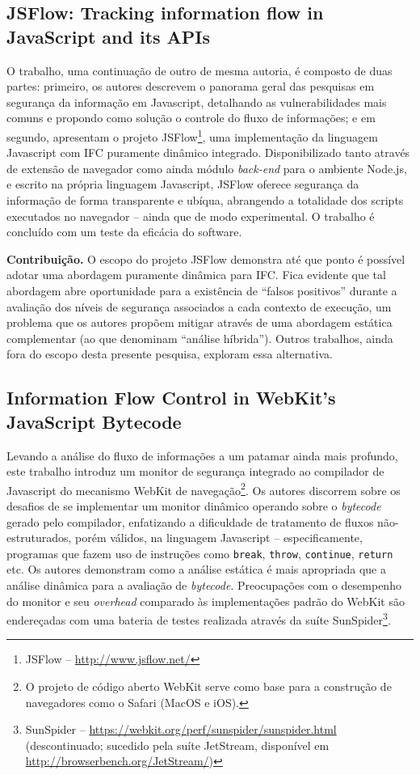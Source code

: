 \subsection{JSFlow: Tracking information flow in JavaScript and its APIs \cite{Hedin2014}}
O trabalho, uma continuação de outro de mesma autoria\cite{Hedin2012}, é composto de duas partes: primeiro, os autores descrevem o panorama geral das pesquisas em segurança da informação em Javascript, detalhando as vulnerabilidades mais comuns e propondo como solução o controle do fluxo de informações; e em segundo, apresentam o projeto JSFlow\footnote{JSFlow -- \url{http://www.jsflow.net/}}, uma implementação da linguagem Javascript com IFC puramente dinâmico integrado. Disponibilizado tanto através de extensão de navegador como ainda módulo \textit{back-end} para o ambiente Node.js, e escrito na própria linguagem Javascript, JSFlow oferece segurança da informação de forma transparente e ubíqua, abrangendo a totalidade dos scripts executados no navegador -- ainda que de modo experimental. O trabalho é concluído com um teste da eficácia do software.

\textbf{Contribuição.} O escopo do projeto JSFlow demonstra até que ponto é possível adotar uma abordagem puramente dinâmica para IFC. Fica evidente que tal abordagem abre oportunidade para a existência de ``falsos positivos'' durante a avaliação dos níveis de segurança associados a cada contexto de execução, um problema que os autores propõem mitigar através de uma abordagem estática complementar (ao que denominam ``análise híbrida''). Outros trabalhos, ainda fora do escopo desta presente pesquisa, exploram essa alternativa.


\subsection{Information Flow Control in WebKit's JavaScript Bytecode \cite{Bichhawat2014}}
Levando a análise do fluxo de informações a um patamar ainda mais profundo, este trabalho introduz um monitor de segurança integrado ao compilador de Javascript do mecanismo WebKit de navegação\footnote{O projeto de código aberto WebKit serve como base para a construção de navegadores como o Safari (MacOS e iOS).}. Os autores discorrem sobre os desafios de se implementar um monitor dinâmico operando sobre o \textit{bytecode} gerado pelo compilador, enfatizando a dificuldade de tratamento de fluxos não-estruturados, porém válidos, na linguagem Javascript -- especificamente, programas que fazem uso de instruções como \texttt{break}, \texttt{throw}, \texttt{continue}, \texttt{return} etc. Os autores demonstram como a análise estática é mais apropriada que a análise dinâmica para a avaliação de \textit{bytecode}. Preocupações com o desempenho do monitor e seu \textit{overhead} comparado às implementações padrão do WebKit são endereçadas com uma bateria de testes realizada através da suíte SunSpider\footnote{SunSpider -- \url{https://webkit.org/perf/sunspider/sunspider.html} (descontinuado; sucedido pela suíte JetStream, disponível em \url{http://browserbench.org/JetStream/})}.

